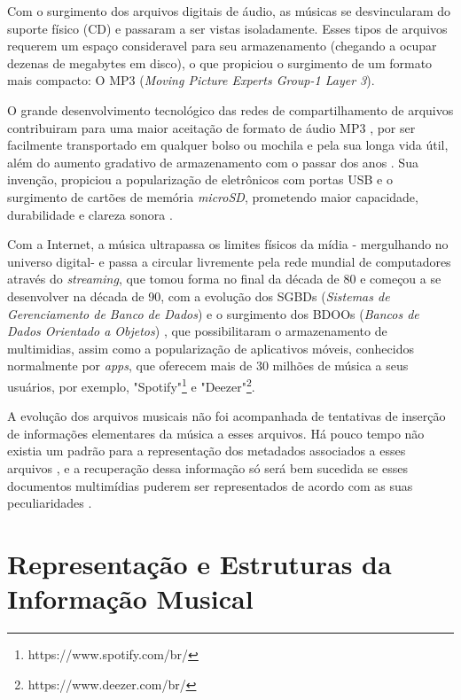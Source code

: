Com o surgimento dos arquivos digitais de áudio, as músicas se desvincularam do suporte físico (CD) e passaram a ser vistas isoladamente. Esses tipos de arquivos requerem um espaço consideravel para seu armazenamento (chegando a ocupar dezenas de megabytes em disco), o que propiciou o surgimento de um formato mais compacto: O MP3 (\textit{Moving Picture Experts Group-1 Layer 3}). 

O grande desenvolvimento tecnológico das redes de compartilhamento de arquivos contribuiram para uma maior aceitação de formato de áudio MP3 \cite{andrade&crispim2008}, por ser facilmente transportado em qualquer bolso ou mochila e pela sua longa vida útil, além do aumento gradativo de armazenamento com o passar dos anos \cite{marchi2005}. Sua invenção, propiciou a popularização de eletrônicos com portas USB e o surgimento de cartões de memória \textit{microSD}, prometendo maior capacidade, durabilidade e clareza sonora \cite{marchi2005}.

Com a Internet, a música ultrapassa os limites físicos da mídia - mergulhando no universo digital- e passa a circular livremente pela rede mundial de computadores através do \textit{streaming}, que tomou forma no final da década de 80 e começou a se desenvolver na década de 90, com a evolução dos SGBDs (\textit{Sistemas de Gerenciamento de Banco de Dados}) e o surgimento dos BDOOs (\textit{Bancos de Dados Orientado a Objetos}) \cite{junior&segundo2008}, que possibilitaram o armazenamento de multimidias, assim como a popularização de aplicativos móveis, conhecidos normalmente por \textit{apps}, que oferecem mais de 30 milhões de música a seus usuários, por exemplo, "Spotify"\footnote{https://www.spotify.com/br/} e "Deezer"\footnote{https://www.deezer.com/br/}.

A evolução dos arquivos musicais não foi acompanhada de tentativas de inserção de informações elementares da música a esses arquivos. Há pouco tempo não existia um padrão para a representação dos metadados associados a esses arquivos \cite{andrade&crispim2008}, e a recuperação dessa informação só será bem sucedida se esses documentos multimídias puderem ser representados de acordo com as suas peculiaridades \cite{gomes2015}.

\section{Representação e Estruturas da Informação Musical}

